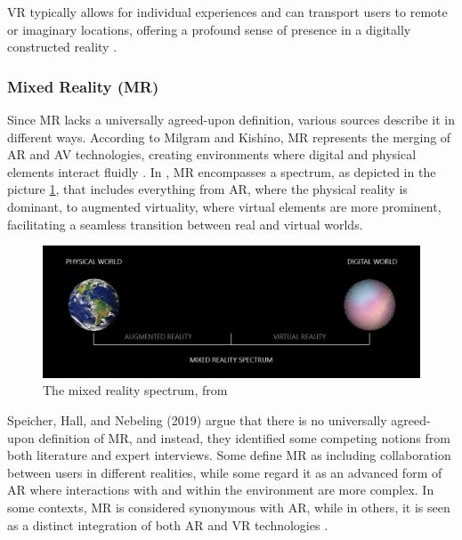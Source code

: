     \ac{VR} typically allows for individual experiences and can transport users to remote or imaginary locations, offering a profound sense 
    of presence in a digitally constructed reality \cite{whatismixedreality, 8712803}.
    

\subsubsection{Mixed Reality (\ac{MR})}

    Since \ac{MR} lacks a universally agreed-upon definition, various sources describe it in different ways. 
    According to Milgram and Kishino, \ac{MR} represents the merging of \ac{AR} and \ac{AV} technologies, creating environments where digital and physical elements interact fluidly \cite{milgram1994}. 
    In \cite{microsoft_mixed_reality}, \ac{MR} encompasses a spectrum, as depicted in the picture \ref{f:mixed-spectrum}, that includes everything
    from \ac{AR}, where the physical reality is dominant, to augmented virtuality, where virtual elements are more prominent, facilitating a seamless
    transition between real and virtual worlds.

    \begin{figure}[!htpb]
        \centering
        \includegraphics[width=0.8\linewidth]{figs/mixed-reality-spectrum.jpeg}
        \caption{The mixed reality spectrum, from \cite{microsoft_mixed_reality}}
        \label{f:mixed-spectrum}
    \end{figure}
    
   

    Speicher, Hall, and Nebeling (2019) argue that there is no universally agreed-upon definition of \ac{MR}, and instead, they identified some competing notions from both literature and expert interviews.
    Some define \ac{MR} as including collaboration between users in different realities, while some regard it as an advanced form of \ac{AR} where interactions with and within the environment are more complex. In some contexts, \ac{MR} is considered synonymous with \ac{AR}, while in others, it is seen as a distinct integration of both \ac{AR} and \ac{VR} technologies \cite{whatismixedreality}. 

